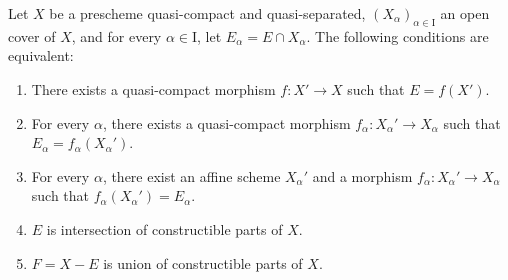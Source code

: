 \begin{proposition}[1.9.3]
\label{IV.1.9.3}
Let $X$ be a prescheme quasi-compact and quasi-separated, $(X_\alpha)_{\alpha\in\mathrm{I}}$ an open cover of $X$, and for every $\alpha\in\mathrm{I}$, let $E_\alpha=E\cap X_\alpha$.
The following conditions are equivalent:
\begin{enumerate}
  \item[a)] There exists a quasi-compact morphism $f:X'\to X$ such that $E=f(X')$.
  \item[a$'$)] For every $\alpha$, there exists a quasi-compact morphism $f_\alpha:X_\alpha'\to X_\alpha$ such that $E_\alpha=f_\alpha(X_\alpha')$.
  \item[a$''$)] For every $\alpha$, there exist an affine scheme $X_\alpha'$ and a morphism $f_\alpha:X_\alpha'\to X_\alpha$ such that $f_\alpha(X_\alpha')=E_\alpha$.
  \item[b)] $E$ is intersection of constructible parts of $X$.
  \item[b$'$)] $F=X-E$ is union of constructible parts of $X$.
\end{enumerate}
\end{proposition}

